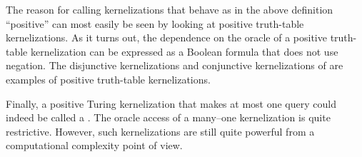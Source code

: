 The reason for calling kernelizations that behave as in the above definition \enquote{positive} can most easily be seen by looking at positive truth-table kernelizations.
As it turns out, the dependence on the oracle of a positive truth-table kernelization can be expressed as a Boolean formula that does not use negation.
The disjunctive kernelizations and conjunctive kernelizations of \textcite{kratsch2014recent} are examples of positive truth-table kernelizations.

Finally, a positive Turing kernelization that makes at most one query could indeed be called a .
The oracle access of a many--one kernelization is quite restrictive.
However, such kernelizations are still quite powerful from a computational complexity point of view.

